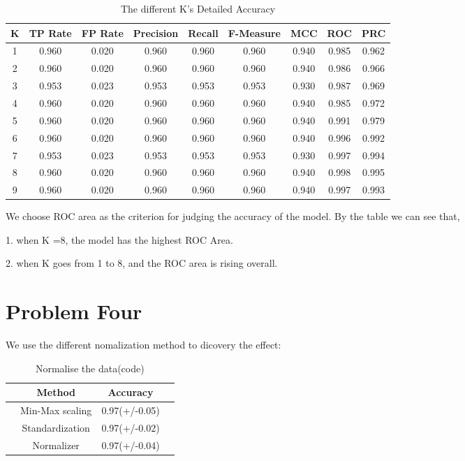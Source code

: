 \documentclass[a4pper,11pt,onecolumn]{article}
\begin{document}
\begin{table}[h] 
	\centering  
	\caption{The different K's Detailed Accuracy }  %
	\begin{tabular}{ccccccccc}  
		\hline
		\hline
		K & TP Rate & FP Rate & Precision & Recall & F-Measure & MCC   & ROC   & PRC   \\ [0.5ex] 
		\hline
		1 & 0.960   & 0.020   & 0.960     & 0.960  & 0.960     & 0.940 & 0.985 & 0.962 \\
		2 & 0.960   & 0.020   & 0.960     & 0.960  & 0.960     & 0.940 & 0.986 & 0.966 \\
		3 & 0.953   & 0.023   & 0.953     & 0.953  & 0.953     & 0.930 & 0.987 & 0.969 \\
		4 & 0.960   & 0.020   & 0.960     & 0.960  & 0.960     & 0.940 & 0.985 & 0.972 \\
		5 & 0.960   & 0.020   & 0.960     & 0.960  & 0.960     & 0.940 & 0.991 & 0.979 \\
		6 & 0.960   & 0.020   & 0.960     & 0.960  & 0.960     & 0.940 & 0.996 & 0.992 \\
		7 & 0.953   & 0.023   & 0.953     & 0.953  & 0.953     & 0.930 & 0.997 & 0.994 \\
		8 & 0.960   & 0.020   & 0.960     & 0.960  & 0.960     & 0.940 & 0.998 & 0.995 \\
		9 & 0.960   & 0.020   & 0.960     & 0.960  & 0.960     & 0.940 & 0.997 & 0.993\\
		\hline
		\hline
	\end{tabular}
\end{table}

We choose ROC area as the criterion for judging the accuracy of the model.
By the table we can see that,

1. when K =8, the model has the highest ROC Area.

2. when K goes from 1 to 8, and the ROC area is rising overall.

\section{Problem Four}

We use the different nomalization method to dicovery the effect:

\begin{table}[h]  
	\centering  
	\caption{Normalise the data(code)}  
	\begin{tabular}{cccc} 
		\hline
		\hline
		& Method & Accuracy  \\ [0.5ex] 
		\hline
		& Min-Max scaling & 0.97(+/-0.05)   \\
		& Standardization & 0.97(+/-0.02)  \\
		& Normalizer & 0.97(+/-0.04)  \\
		\hline
		\hline
	\end{tabular}
\end{table}
\end{document}
